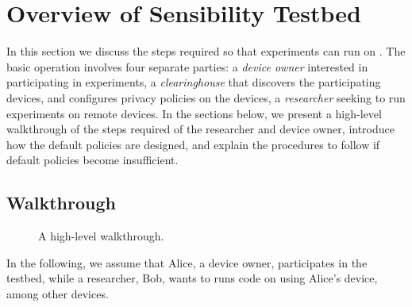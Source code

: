 \section{Overview of Sensibility Testbed}\label{sec-overview}

In this section we discuss the steps required so that experiments 
can run on \sysname. The basic operation involves four separate 
parties: a \textit{device owner} interested in participating in 
experiments, a \textit{clearinghouse} that discovers the
participating devices, and configures privacy policies on the 
devices,  a \textit{researcher} seeking to run experiments on 
remote devices. 
%
In the sections below, we present a high-level walkthrough of the steps 
required of the researcher and device owner, 
introduce how the default policies are designed, and explain the 
procedures to follow if default policies become insufficient. 


\subsection{Walkthrough}\label{sec-walkthrough}

\begin{figure}
\caption{\small A high-level walkthrough. \label{fig-walkthrough}}
\end{figure}

In the following, we assume that Alice, a device owner, participates in 
the testbed, while a researcher, Bob, wants to runs code on \sysname 
using Alice's device, among other devices.


